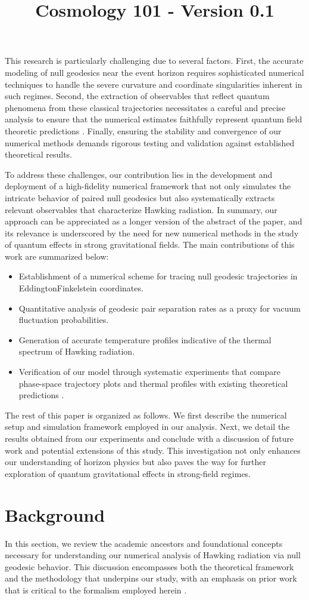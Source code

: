 \documentclass{article}\usepackage{graphicx} \usepackage{amsmath} \usepackage{colortbl}\title{Cosmology 101 - Version 0.1}
\begin{document}
This research is particularly challenging due to several factors. First, the accurate modeling of null geodesics near the event horizon requires sophisticated numerical techniques to handle the severe curvature and coordinate singularities inherent in such regimes. Second, the extraction of observables that reflect quantum phenomena from these classical trajectories necessitates a careful and precise analysis to ensure that the numerical estimates faithfully represent quantum field theoretic predictions \cite{Jacobson1993}. Finally, ensuring the stability and convergence of our numerical methods demands rigorous testing and validation against established theoretical results.

To address these challenges, our contribution lies in the development and deployment of a high-fidelity numerical framework that not only simulates the intricate behavior of paired null geodesics but also systematically extracts relevant observables that characterize Hawking radiation. In summary, our approach can be appreciated as a longer version of the abstract of the paper, and its relevance is underscored by the need for new numerical methods in the study of quantum effects in strong gravitational fields. The main contributions of this work are summarized below:
\begin{itemize}
    \item Establishment of a numerical scheme for tracing null geodesic trajectories in Eddington\textendash Finkelstein coordinates.
    \item Quantitative analysis of geodesic pair separation rates as a proxy for vacuum fluctuation probabilities.
    \item Generation of accurate temperature profiles indicative of the thermal spectrum of Hawking radiation.
    \item Verification of our model through systematic experiments that compare phase-space trajectory plots and thermal profiles with existing theoretical predictions \cite{Unruh1976}.
\end{itemize}

The rest of this paper is organized as follows. We first describe the numerical setup and simulation framework employed in our analysis. Next, we detail the results obtained from our experiments and conclude with a discussion of future work and potential extensions of this study. This investigation not only enhances our understanding of horizon physics but also paves the way for further exploration of quantum gravitational effects in strong-field regimes.\section{Background}
In this section, we review the academic ancestors and foundational concepts necessary for understanding our numerical analysis of Hawking radiation via null geodesic behavior. This discussion encompasses both the theoretical framework and the methodology that underpins our study, with an emphasis on prior work that is critical to the formalism employed herein \cite{Hawking1975 Jacobson1993 Unruh1976}.
\end{document}
